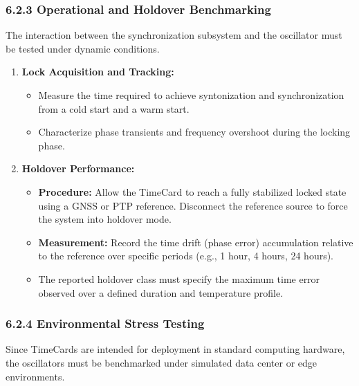 \subsubsection{6.2.3 Operational and Holdover
Benchmarking}\label{operational-and-holdover-benchmarking}

The interaction between the synchronization subsystem and the oscillator
must be tested under dynamic conditions.

\begin{enumerate}
\def\labelenumi{\arabic{enumi}.}
\tightlist
\item
  \textbf{Lock Acquisition and Tracking:}

  \begin{itemize}
  \tightlist
  \item
    Measure the time required to achieve syntonization and
    synchronization from a cold start and a warm start.
  \item
    Characterize phase transients and frequency overshoot during the
    locking phase.
  \end{itemize}
\item
  \textbf{Holdover Performance:}

  \begin{itemize}
  \tightlist
  \item
    \textbf{Procedure:} Allow the TimeCard to reach a fully stabilized
    locked state using a GNSS or PTP reference. Disconnect the reference
    source to force the system into holdover mode.
  \item
    \textbf{Measurement:} Record the time drift (phase error)
    accumulation relative to the reference over specific periods (e.g.,
    1 hour, 4 hours, 24 hours).
  \item
    The reported holdover class must specify the maximum time error
    observed over a defined duration and temperature profile.
  \end{itemize}
\end{enumerate}

\subsubsection{6.2.4 Environmental Stress
Testing}\label{environmental-stress-testing}

Since TimeCards are intended for deployment in standard computing
hardware, the oscillators must be benchmarked under simulated data
center or edge environments.

